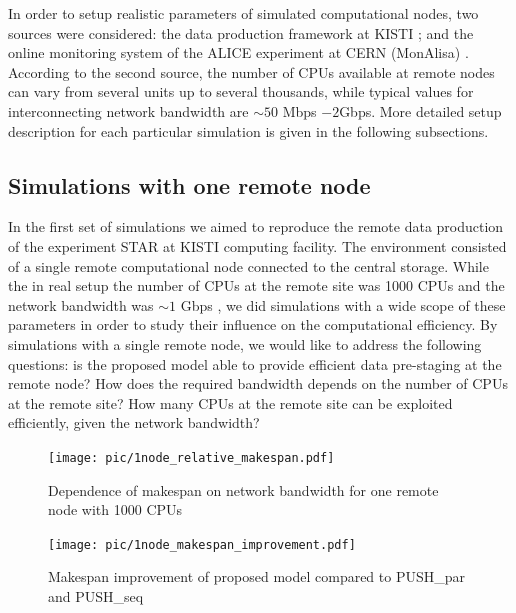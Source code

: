 \documentclass{svjour3}                     %
\begin{document}
In order to setup realistic parameters of simulated computational nodes, two sources were considered: the data production framework at KISTI \cite{KISTI-production}; and the online monitoring system of the ALICE experiment at CERN (MonAlisa) \cite{MonAlisa}. According to the second source, the number of CPUs available at remote nodes can vary from several units up to several thousands, while typical values for interconnecting network bandwidth are $\sim 50$ Mbps $- 2 $Gbps. More detailed setup description for each particular simulation is given in the following subsections. 

\subsection{Simulations with one remote node}
In the first set of simulations we aimed to reproduce the remote data production of the experiment STAR at KISTI computing facility. The environment consisted of a single remote computational node connected to the central storage. While the in real setup the number of CPUs at the remote site was 1000 CPUs and the network bandwidth was $\sim1$ Gbps \cite{KISTI-production}, we did simulations with a wide scope of these parameters in order to study their influence on the computational efficiency. By simulations with a single remote node, we would like to address the following questions: is the proposed model able to provide efficient data pre-staging at the remote node? How does the required bandwidth depends on the number of CPUs at the remote site? How many CPUs at the remote site can be exploited efficiently, given the network bandwidth?

\begin{figure}[h]
\centering
\begin{minipage}{.7\textwidth}
\centering
    \texttt{[image: pic/1node\_relative\_makespan.pdf]}

    \caption{Dependence of makespan on network bandwidth for one remote node with 1000 CPUs}
    \label{1node_relative_makespan}
\end{minipage}\hspace{1pc}%
\begin{minipage}{.7\textwidth}
\centering
    \texttt{[image: pic/1node\_makespan\_improvement.pdf]}
    \caption{Makespan improvement of proposed model compared to PUSH\_par and PUSH\_seq}
    \label{1node_makespan_improvement}
\end{minipage} 
\end{figure}
\end{document}
